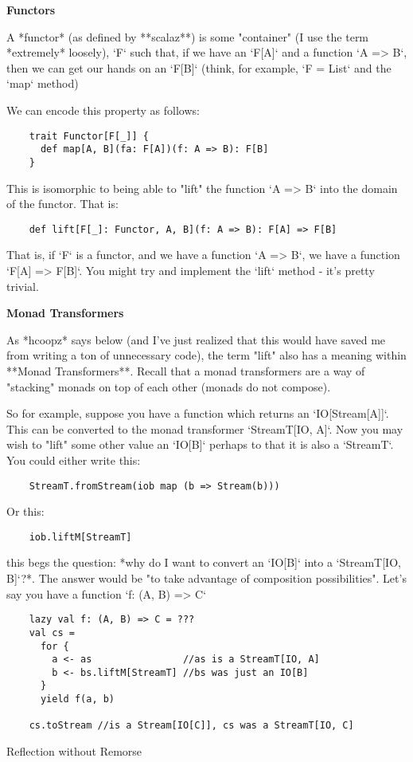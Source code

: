 \documentclass{article}
\begin{document}
\textbf{Functors}

A *functor* (as defined by **scalaz**) is some "container" (I use the term *extremely* loosely), `F` such that, if we have an `F[A]` and a function `A => B`, then we can get our hands on an `F[B]` (think, for example, `F = List` and the `map` method)

We can encode this property as follows:

\begin{verbatim}
    trait Functor[F[_]] { 
      def map[A, B](fa: F[A])(f: A => B): F[B]
    }
\end{verbatim}

This is isomorphic to being able to "lift" the function `A => B` into the domain of the functor. That is:

\begin{verbatim}
    def lift[F[_]: Functor, A, B](f: A => B): F[A] => F[B]
\end{verbatim}

That is, if `F` is a functor, and we have a function `A => B`, we have a function `F[A] => F[B]`. You might try and implement the `lift` method - it's pretty trivial.

\textbf{Monad Transformers}

As *hcoopz* says below (and I've just realized that this would have saved me from writing a ton of unnecessary code), the term "lift" also has a meaning within **Monad Transformers**. Recall that a monad transformers are a way of "stacking" monads on top of each other (monads do not compose).

So for example, suppose you have a function which returns an `IO[Stream[A]]`. This can be converted to the monad transformer `StreamT[IO, A]`. Now you may wish to "lift" some other value an `IO[B]` perhaps to that it is also a `StreamT`. You could either write this:
\begin{verbatim}
    StreamT.fromStream(iob map (b => Stream(b)))
\end{verbatim}

Or this:
\begin{verbatim}
    iob.liftM[StreamT]
\end{verbatim}    

this begs the question: *why do I want to convert an `IO[B]` into a `StreamT[IO, B]`?*. The answer would be "to take advantage of composition possibilities". Let's say you have a function `f: (A, B) => C`

\begin{verbatim}
    lazy val f: (A, B) => C = ???
    val cs = 
      for {
        a <- as                //as is a StreamT[IO, A]
        b <- bs.liftM[StreamT] //bs was just an IO[B]
      }
      yield f(a, b)

    cs.toStream //is a Stream[IO[C]], cs was a StreamT[IO, C]
\end{verbatim}



Reflection without Remorse
\end{document}
